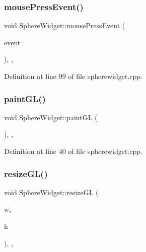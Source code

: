 \subsubsection{\texorpdfstring{mouse\+Press\+Event()}{mousePressEvent()}}
{\footnotesize\ttfamily void Sphere\+Widget\+::mouse\+Press\+Event (\begin{DoxyParamCaption}\item[{Q\+Mouse\+Event $\ast$}]{event }\end{DoxyParamCaption})\hspace{0.3cm}{\ttfamily [override]}, {\ttfamily [protected]}, {\ttfamily [virtual]}}



Definition at line 99 of file spherewidget.\+cpp.

\mbox{\label{class_sphere_widget_a122b798a2eb0c251f53671009abdf8c8}} 
\subsubsection{\texorpdfstring{paint\+G\+L()}{paintGL()}}
{\footnotesize\ttfamily void Sphere\+Widget\+::paint\+GL (\begin{DoxyParamCaption}{ }\end{DoxyParamCaption})\hspace{0.3cm}{\ttfamily [override]}, {\ttfamily [protected]}, {\ttfamily [virtual]}}



Definition at line 40 of file spherewidget.\+cpp.

\mbox{\label{class_sphere_widget_aaf11c928f52c91d7f60317922df7ca73}} 
\subsubsection{\texorpdfstring{resize\+G\+L()}{resizeGL()}}
{\footnotesize\ttfamily void Sphere\+Widget\+::resize\+GL (\begin{DoxyParamCaption}\item[{int}]{w,  }\item[{int}]{h }\end{DoxyParamCaption})\hspace{0.3cm}{\ttfamily [override]}, {\ttfamily [protected]}, {\ttfamily [virtual]}}



